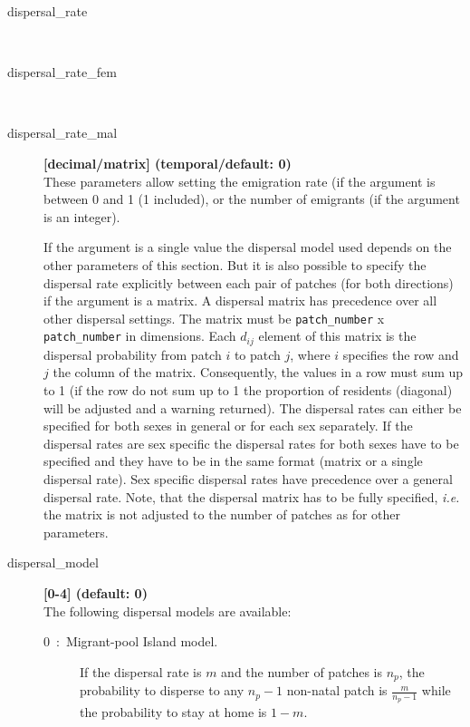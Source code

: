 \documentclass[letterpaper,12pt,oneside]{book}
\begin{document}
\begin{description}
\item[dispersal\_rate]\hspace*{\fill}\\
\vspace{-9mm}
\item[dispersal\_rate\_fem]\hspace*{\fill}\\
\vspace{-9mm}
\item[dispersal\_rate\_mal]\textbf{[decimal/matrix] (temporal/default: 0)}\\
These parameters allow setting the emigration rate (if the argument is between 0 and 1 (1 included), or the number of emigrants (if the argument is an integer). 

If the argument is a single value the dispersal model used depends on the other parameters of this section. But it is also possible to specify the dispersal rate explicitly between each pair of patches (for both directions) if the argument is a matrix. A dispersal matrix has precedence over all other dispersal settings. The matrix must be \texttt{patch\_number} x \texttt{patch\_number} in dimensions. Each $d_{ij}$ element of this matrix is the dispersal probability from patch $i$ to patch $j$, where $i$ specifies the row and $j$ the column of the matrix. Consequently, the values in a row must sum up to 1 (if the row do not sum up to 1 the proportion of residents (diagonal) will be adjusted and a warning returned). The dispersal rates can either be specified for both sexes in general or for each sex separately. If the dispersal rates are sex specific the dispersal rates for both sexes have to be specified and they have to be in the same format (matrix or a single dispersal rate). Sex specific dispersal rates have precedence over a general dispersal rate. Note, that the dispersal matrix has to be fully specified, \textit{i.e.} the matrix is not adjusted to the number of patches as for other parameters. 

\item[dispersal\_model] \textbf{[0-4] (default: 0)}\\
The following dispersal models are available:
\begin{description}
\item[0~:~Migrant-pool Island model.] If the dispersal rate is $m$ and the number of patches is $n_{p}$, the probability to disperse to any $n_{p}-1$ non-natal patch is $\frac{m}{n_{p}-1}$ while the probability to stay at home is $1-m$.


\end{description}
\end{description}
\end{document}
